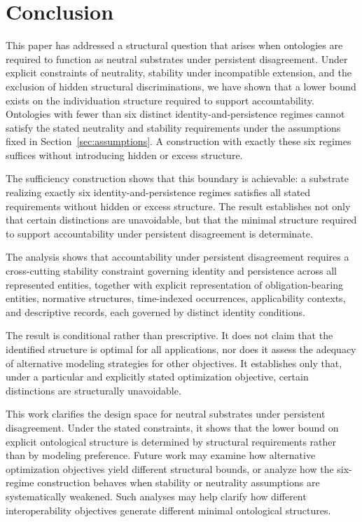 \section{Conclusion}
\label{sec:conclusion}

This paper has addressed a structural question that arises when ontologies
are required to function as neutral substrates under persistent
disagreement.
Under explicit constraints of neutrality, stability under incompatible extension,
and the exclusion of hidden structural discriminations, we have
shown that a lower bound exists on the individuation structure
required to support accountability.
Ontologies with fewer than six distinct identity-and-persistence regimes
cannot satisfy the stated neutrality and stability requirements
under the assumptions fixed in Section~\ref{sec:assumptions}.
A construction with exactly these six regimes suffices without introducing hidden or excess structure.

The sufficiency construction shows that this boundary is achievable:
a substrate realizing exactly six identity-and-persistence regimes
satisfies all stated requirements without hidden or excess structure.
The result establishes not only that certain distinctions are unavoidable,
but that the minimal structure required to support
accountability under persistent disagreement is determinate.

The analysis shows that accountability under persistent disagreement
requires a cross-cutting stability constraint governing identity and
persistence across all represented entities,
together with explicit representation of obligation-bearing entities, normative structures,
time-indexed occurrences, applicability contexts, and descriptive records,
each governed by distinct identity conditions.

The result is conditional rather than prescriptive.
It does not claim that the identified structure
is optimal for all applications,
nor does it assess the adequacy of
alternative modeling strategies for other objectives.
It establishes only that, under a particular and explicitly stated
optimization objective, certain distinctions are structurally unavoidable.

This work clarifies the design space for neutral substrates under persistent
disagreement.
Under the stated constraints, it shows that the
lower bound on explicit ontological structure is determined by structural
requirements rather than by modeling preference.
Future work may examine how alternative optimization objectives
yield different structural bounds,
or analyze how the six-regime construction behaves
when stability or neutrality assumptions are systematically weakened.
Such analyses may help clarify how different interoperability
objectives generate different minimal ontological structures.


